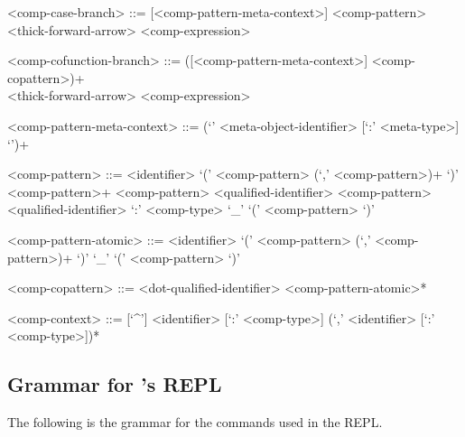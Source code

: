 \begin{grammar}
<comp-case-branch> ::= [<comp-pattern-meta-context>] <comp-pattern>\\
<thick-forward-arrow> <comp-expression>

<comp-cofunction-branch> ::= ([<comp-pattern-meta-context>] <comp-copattern>)+\\
<thick-forward-arrow> <comp-expression>

<comp-pattern-meta-context> ::= (`{' <meta-object-identifier> [`:' <meta-type>] `}')+

<comp-pattern> ::= <identifier>
\alt `(' <comp-pattern> (`,' <comp-pattern>)+ `)'
 <comp-pattern>+
 <comp-pattern>
 <qualified-identifier> <comp-pattern>
 <qualified-identifier>
 `:' <comp-type>
\alt `_'
\alt `(' <comp-pattern> `)'

<comp-pattern-atomic> ::= <identifier>
\alt `(' <comp-pattern> (`,' <comp-pattern>)+ `)'
\alt `_'
\alt `(' <comp-pattern> `)'

<comp-copattern> ::= <dot-qualified-identifier> <comp-pattern-atomic>*

<comp-context> ::= [`^']
\alt <identifier> [`:' <comp-type>] (`,' <identifier> [`:' <comp-type>])*
\end{grammar}

\subsection{Grammar for \Harpoon's \acs{REPL}}\label{section:syntax-harpoon-repl}

The following is the grammar for the commands used in the \Harpoon \ac{REPL}.

